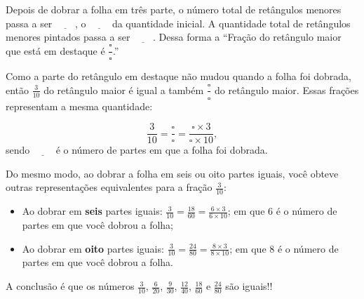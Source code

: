 \begin{refletindo*}{}
Depois de dobrar a folha em três parte, o número total de retângulos menores passa a ser $\underline{\phantom{1000}}$, o $\underline{\phantom{1000}}$ da quantidade inicial. A  quantidade total de retângulos menores pintados passa a ser $\underline{\phantom{1000}}$. Dessa forma a ``Fração do retângulo maior que está em destaque é $\dfrac{\square}{\square}$.''

Como a parte do retângulo em destaque não mudou quando a folha foi dobrada,  então $\frac{3}{10}$ do retângulo maior é igual a também $\dfrac{\square}{\square}$ do retângulo maior. Essas frações representam a mesma quantidade:

$$\dfrac{3}{10} = \dfrac{\square}{\square} = \dfrac{\square \times 3}{\square \times 10},$$
sendo $\underline{\phantom{1000}}$ é o número de partes em que a folha foi dobrada.

Do mesmo modo, ao dobrar a folha em seis ou oito partes iguais, você obteve outras representações equivalentes para a fração $\frac{3}{10}$:
\begin{itemize} %
  \item     Ao dobrar em     {\bfseries seis}     partes iguais:     $\frac{3}{10} = \frac{18}{60} = \frac{6 \times 3}{6 \times 10}$; em que 6 é o número de partes em que você dobrou a folha;
  \item     Ao dobrar em     {\bfseries oito}     partes iguais:     $\frac{3}{10} = \frac{24}{80} = \frac{8 \times 3}{8 \times 10}$; em que 8 é o número de partes em que você dobrou a folha.
\end{itemize} %

A conclusão é que os números $\frac{3}{10}$, $\frac{6}{20}$, $\frac{9}{30}$, $\frac{12}{40}$, $\frac{18}{60}$ e $\frac{24}{80}$ são iguais!!

\end{refletindo*}
\vfill

